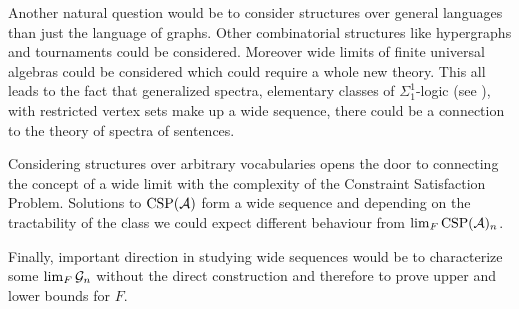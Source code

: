 Another natural question would be to consider structures over general languages than just the language of graphs. Other combinatorial structures like hypergraphs and tournaments could be considered. Moreover wide limits of finite universal algebras could be considered which could require a whole new theory. This all leads to the fact that generalized spectra, elementary classes of $\Sigma_1^1$-logic (see \cite{Fagin74}), with restricted vertex sets make up a wide sequence, there could be a connection to the theory of spectra of sentences.


Considering structures over arbitrary vocabularies opens the door to connecting the concept of a wide limit with the complexity of the Constraint Satisfaction Problem. Solutions to $\text{CSP}(\mathcal{A})$ form a wide sequence and depending on the tractability of the class we could expect different behaviour from $\lim_{F}\text{CSP}(\mathcal{A})_n$.

Finally, important direction in studying wide sequences would be to characterize some $\lim_F\mathcal{G}_n$ without the direct construction and therefore to prove upper and lower bounds for $F$.
